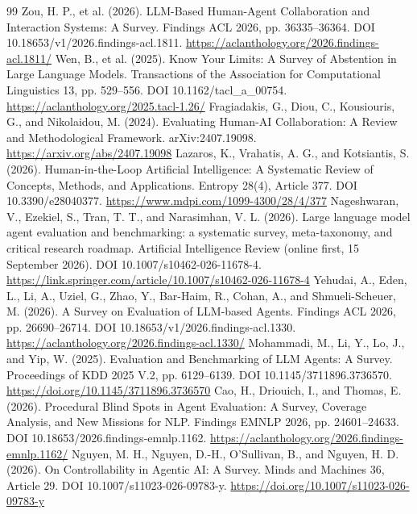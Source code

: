 \begin{thebibliography}{99}
\setlength{\itemsep}{-0.85ex}
 Zou, H. P., et al. (2026). LLM-Based Human-Agent Collaboration and Interaction Systems: A Survey. Findings ACL 2026, pp. 36335--36364. DOI 10.18653/v1/2026.findings-acl.1811. \url{https://aclanthology.org/2026.findings-acl.1811/}
 Wen, B., et al. (2025). Know Your Limits: A Survey of Abstention in Large Language Models. Transactions of the Association for Computational Linguistics 13, pp. 529--556. DOI 10.1162/tacl\_a\_00754. \url{https://aclanthology.org/2025.tacl-1.26/}
 Fragiadakis, G., Diou, C., Kousiouris, G., and Nikolaidou, M. (2024). Evaluating Human-AI Collaboration: A Review and Methodological Framework. arXiv:2407.19098. \url{https://arxiv.org/abs/2407.19098}
 Lazaros, K., Vrahatis, A. G., and Kotsiantis, S. (2026). Human-in-the-Loop Artificial Intelligence: A Systematic Review of Concepts, Methods, and Applications. Entropy 28(4), Article 377. DOI 10.3390/e28040377. \url{https://www.mdpi.com/1099-4300/28/4/377}
 Nageshwaran, V., Ezekiel, S., Tran, T. T., and Narasimhan, V. L. (2026). Large language model agent evaluation and benchmarking: a systematic survey, meta-taxonomy, and critical research roadmap. Artificial Intelligence Review (online first, 15 September 2026). DOI 10.1007/s10462-026-11678-4. \url{https://link.springer.com/article/10.1007/s10462-026-11678-4}
 Yehudai, A., Eden, L., Li, A., Uziel, G., Zhao, Y., Bar-Haim, R., Cohan, A., and Shmueli-Scheuer, M. (2026). A Survey on Evaluation of LLM-based Agents. Findings ACL 2026, pp. 26690--26714. DOI 10.18653/v1/2026.findings-acl.1330. \url{https://aclanthology.org/2026.findings-acl.1330/}
 Mohammadi, M., Li, Y., Lo, J., and Yip, W. (2025). Evaluation and Benchmarking of LLM Agents: A Survey. Proceedings of KDD 2025 V.2, pp. 6129--6139. DOI 10.1145/3711896.3736570. \url{https://doi.org/10.1145/3711896.3736570}
 Cao, H., Driouich, I., and Thomas, E. (2026). Procedural Blind Spots in Agent Evaluation: A Survey, Coverage Analysis, and New Missions for NLP. Findings EMNLP 2026, pp. 24601--24633. DOI 10.18653/2026.findings-emnlp.1162. \url{https://aclanthology.org/2026.findings-emnlp.1162/}
 Nguyen, M. H., Nguyen, D.-H., O'Sullivan, B., and Nguyen, H. D. (2026). On Controllability in Agentic AI: A Survey. Minds and Machines 36, Article 29. DOI 10.1007/s11023-026-09783-y. \url{https://doi.org/10.1007/s11023-026-09783-y}

\end{thebibliography}
